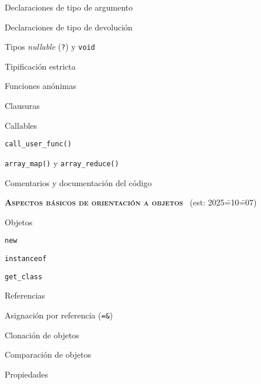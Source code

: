 \begin{longenum}
\begin{longenum}
\begin{longenum}
            \begin{longenum}
                \item Declaraciones de tipo de argumento
                \item Declaraciones de tipo de devolución
                \item Tipos \textit{nullable} (\texttt{?}) y \texttt{void}
                \item Tipificación estricta
            \end{longenum}
            \item Funciones anónimas
            \begin{longenum}
                \item Clausuras
            \end{longenum}
            \item Callables
            \begin{longenum}
                \item \texttt{call\_user\_func()}
                \item \texttt{array\_map()} y \texttt{array\_reduce()}
            \end{longenum}
        \end{longenum}
        \item Comentarios y documentación del código
    \end{longenum}
    \item \textbf{\textsc{Aspectos básicos de orientación a objetos}} \ (est: 2025\==10\==07)
    \begin{longenum}
        \item Objetos
        \begin{longenum}
            \item \texttt{new}
            \item \texttt{instanceof}
            \item \texttt{get\_class}
        \end{longenum}
        \item Referencias
        \begin{longenum}
            \item Asignación por referencia (\texttt{=\&})
        \end{longenum}
        \item Clonación de objetos
        \item Comparación de objetos
        \item Propiedades
        \begin{longenum}

\end{longenum}
\end{longenum}
\end{longenum}
